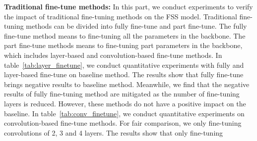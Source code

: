 \documentclass{article}
\begin{document}
\textbf{Traditional fine-tune methods:} In this part, we conduct experiments to verify the impact of traditional fine-tuning methods on the FSS model. Traditional fine-tuning methods can be divided into fully fine-tune and part fine-tune. The fully fine-tune method means to fine-tuning all the parameters in the backbone. The part fine-tune methods means to fine-tuning part parameters in the backbone, which includes layer-based and convolution-based fine-tune methods. In table~\ref{tab:layer_finetune}, we conduct quantitative experiments with fully and layer-based fine-tune on baseline method. The results show that fully fine-tune brings negative results to baseline method. Meanwhile, we find that the negative results of fully fine-tuning method are mitigated as the number of fine-tuning layers is reduced. However, these methods do not have a positive impact on the baseline. In table~\ref{tab:conv_finetune}, we conduct quantitative experiments on convolution-based fine-tune methods. For fair comparison, we only fine-tuning convolutions of 2, 3 and 4 layers. The results show that only fine-tuning  \\
\end{document}

